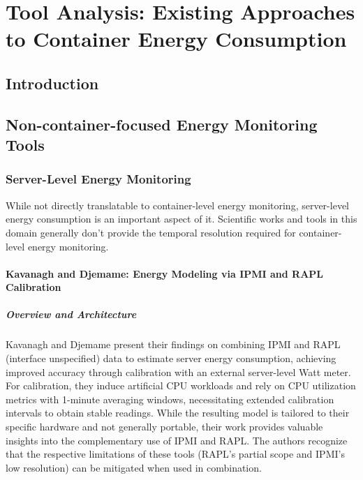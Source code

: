 \chapter{Tool Analysis: Existing Approaches to Container Energy Consumption}
\label{chap:tool-analysis}

\section{Introduction}
\label{sec:tool-intro}

\section{Non-container-focused Energy Monitoring Tools}
\label{sec:non-k8s-tools}
\subsection{Server-Level Energy Monitoring}
\label{sec:server-tools}
While not directly translatable to container-level energy monitoring, server-level energy consumption is an important aspect of it. Scientific works and tools in this domain generally don't provide the temporal resolution required for container-level energy monitoring.

\subsubsection{Kavanagh and Djemame: Energy Modeling via IPMI and RAPL Calibration}
\label{sec:kavanagh}

\paragraph{Overview and Architecture}
Kavanagh and Djemame\parencite{kavanagh2019rapid} present their findings on combining IPMI and RAPL (interface unspecified) data to estimate server energy consumption, achieving improved accuracy through calibration with an external server-level Watt meter. For calibration, they induce artificial CPU workloads and rely on CPU utilization metrics with 1-minute averaging windows, necessitating extended calibration intervals to obtain stable readings. While the resulting model is tailored to their specific hardware and not generally portable, their work provides valuable insights into the complementary use of IPMI and RAPL. The authors recognize that the respective limitations of these tools (RAPL’s partial scope and IPMI’s low resolution) can be mitigated when used in combination.


